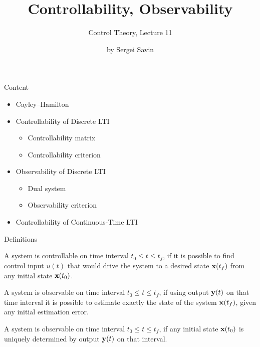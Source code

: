 \documentclass{beamer}
\title{Controllability, Observability}
\subtitle{Control Theory, Lecture 11}
\author{by Sergei Savin}
\date{\mydate}
\begin{document}
\maketitle


\begin{frame}{Content}
\begin{itemize}
\item Cayley–Hamilton
\item Controllability of Discrete LTI
\begin{itemize}
    \item Controllability matrix
    \item Controllability criterion
\end{itemize}
\item Observability of Discrete LTI
\begin{itemize}
    \item Dual system
    \item Observability criterion
\end{itemize}
\item Controllability of Continuous-Time LTI
\end{itemize}
\end{frame}







\begin{frame}{Definitions}
	\begin{flushleft}
		
		\begin{definition}[Controllability]
			A system is controllable on time interval $t_0 \leq t \leq t_f$, if it is possible to find control input $u(t)$ that would drive the system to a desired state $\mathbf{x}(t_f)$ from any initial state $\mathbf{x}(t_0)$.
		\end{definition}
		
		\begin{definition}[Observability]
			A system is observable on time interval $t_0 \leq t \leq t_f$, if using output $\mathbf{y}(t)$ on that time interval it is possible to estimate exactly the state of the system $\mathbf{x}(t_f)$, given any initial estimation error.
		\end{definition}
	
		\begin{definition}
				A system is observable on time interval $t_0 \leq t \leq t_f$, if any initial state $\mathbf{x}(t_0)$ is uniquely determined by output $\mathbf{y}(t)$ on that interval.
		\end{definition}
		
	\end{flushleft}
\end{frame}
\end{document}
